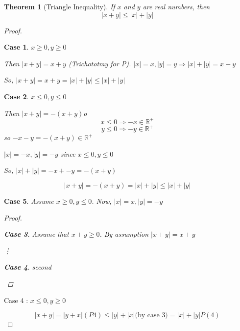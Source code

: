 \documentclass{article} %
\theoremstyle{plain}
\newtheorem{theorem}{Theorem}
\theoremstyle{case}
\newtheorem{case}{Case}
\begin{document}
    \begin{theorem}[Triangle Inequality]

    If $x$  and $y$ are real numbers, then
    \[ |x+y| \leq |x| + |y| \]
    \end{theorem}
  \begin{proof}
    \begin{case}
      $x \geq 0, y \geq 0$

      Then $|x+y| = x+y$ (Trichototmy for P).  $|x| = x, |y|=y \Rightarrow |x|+|y| = x+y$

      So, $|x+y| = x+y = |x|+|y| \leq |x|+|y|$
    \end{case}
    \begin{case}
      $x \leq 0, y \leq 0$

      Then $|x+y| = -(x+y)$o
      \[ x \leq 0 \Rightarrow  -x \in \mathbb{R}^+ \]
      \[ y \leq 0 \Rightarrow  -y \in \mathbb{R}^+ \]
      so $-x-y = -(x+y) \in \mathbb{R}^+$

      $|x| = -x, |y|=-y$ since $x \leq 0, y \leq 0$

      So, $|x|+|y| = -x + -y = -(x+y)$

      \[ |x+y| = -(x+y) = |x| + |y| \leq |x| + |y| \]
    \end{case}
    \begin{case}
      Assume $x \geq 0, y \leq 0$.  Now, $|x| = x, |y| = -y$
      \begin{proof}
        \begin{case}
          Assume that $x+y \geq 0$.  By assumption $|x+y| = x+y$

          \vdots
        \end{case}
        \begin{case}
          second

        \end{case}
      \end{proof}

    \end{case}
    Case 4 : $ x \leq 0, y \geq 0$

    \[ |x+y|=|y+x| (P4) \leq |y|+|x| \text{(by case 3)} = |x| + |y| P(4)\]
  \end{proof}
\end{document}
